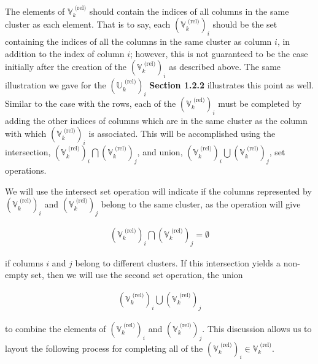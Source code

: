 \documentclass[../../ClusteringConnectionsMAIN.tex]{subfiles}
\begin{document}
\begin{flushleft}
\begin{large}

The elements of $\mathbb{V}_k^\text{ (rel)}$ should contain the indices of all columns in the same cluster as each element.  That is to say, each $\left( \mathbb{V}_k^\text{ (rel)} \right)_i$ should be the set containing the indices of all the columns in the same cluster as column $i$, in addition to the index of column $i$; however, this is not guaranteed to be the case initially after the creation of the $\left( \mathbb{V}_k^\text{ (rel)} \right)_i$ as described above. The same illustration we gave for the $\left( \mathbb{U}_k^\text{ (rel)} \right)_i$ \textbf{Section 1.2.2} illustrates this point as well.  Similar to the case with the rows, each of the $\left( \mathbb{V}_k^\text{ (rel)} \right)_i$ must be completed by adding the other indices of columns which are in the same cluster as the column with which $\left( \mathbb{V}_k^\text{ (rel)} \right)_i$ is associated.  This will be accomplished using the intersection, $\left( \mathbb{V}_k^\text{ (rel)} \right)_i \bigcap \left( \mathbb{V}_k^\text{ (rel)} \right)_j$, and union, $\left( \mathbb{V}_k^\text{ (rel)} \right)_i \bigcup \left( \mathbb{V}_k^\text{ (rel)} \right)_j$, set operations.  \newline

We will use the intersect set operation will indicate if the columns represented by $\left( \mathbb{V}_k^\text{ (rel)} \right)_i$ and $\left( \mathbb{V}_k^\text{ (rel)} \right)_j$ belong to the same cluster, as the operation will give

\begin{align*}
\left( \mathbb{V}_k^\text{ (rel)} \right)_i \bigcap \left( \mathbb{V}_k^\text{ (rel)} \right)_j = \emptyset
\end{align*}

if columns $i$ and $j$ belong to different clusters.  If this intersection yields a non-empty set, then we will use the second set operation, the union 

\begin{align*}
\left( \mathbb{V}_k^\text{ (rel)} \right)_i \bigcup \left( \mathbb{V}_k^\text{ (rel)} \right)_j
\end{align*}

to combine the elements of $\left( \mathbb{V}_k^\text{ (rel)} \right)_i$ and $\left( \mathbb{V}_k^\text{ (rel)} \right)_j$.  This discussion allows us to layout the following process for completing all of the $\left( \mathbb{V}_k^\text{ (rel)} \right)_i \in \mathbb{V}_k^\text{ (rel)}$.  


\end{large}
\end{flushleft}
\end{document}
